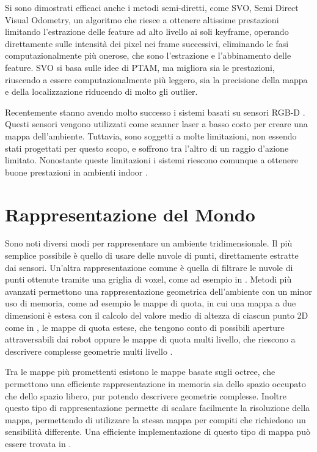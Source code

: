 Si sono dimostrati efficaci anche i metodi semi-diretti, come SVO, Semi Direct Visual Odometry, un algoritmo che riesce a ottenere altissime prestazioni limitando l'estrazione delle feature ad alto livello ai soli keyframe, operando direttamente sulle intensità dei pixel nei frame successivi, eliminando le fasi computazionalmente più onerose, che sono l'estrazione e l'abbinamento delle feature. SVO si basa sulle idee di PTAM, ma migliora sia le prestazioni, riuscendo a essere computazionalmente più leggero, sia la precisione della mappa e della localizzazione riducendo di molto gli outlier.

Recentemente stanno avendo molto successo i sistemi basati su sensori RGB-D \cite{izadi2011kinectfusion} \cite{henry2012rgb}. Questi sensori vengono utilizzati come scanner laser a basso costo per creare una mappa dell'ambiente. Tuttavia, sono soggetti a molte limitazioni, non essendo stati progettati per questo scopo, e soffrono tra l'altro di un raggio d'azione limitato. Nonostante queste limitazioni i sistemi riescono comunque a ottenere buone prestazioni in ambienti indoor \cite{sturm2012benchmark}.

\section{Rappresentazione del Mondo}

Sono noti diversi modi per rappresentare un ambiente tridimensionale.
Il più semplice possibile è quello di usare delle nuvole di punti, direttamente estratte dai sensori. Un'altra rappresentazione comune è quella di filtrare le nuvole di punti ottenute tramite una griglia di voxel, come ad esempio in \cite{30724}.
Metodi più avanzati permettono una rappresentazione geometrica dell'ambiente con un minor uso di memoria, come ad esempio le mappe di quota, in cui una mappa a due dimensioni è estesa con il calcolo del valore medio di altezza di ciascun punto 2D come in \cite{herbert1989terrain}, le mappe di quota estese, che tengono conto di possibili aperture attraversabili dai robot oppure le mappe di quota multi livello, che riescono a descrivere complesse geometrie multi livello \cite{4058725}.

Tra le mappe più promettenti esistono le mappe basate sugli octree, che permettono una efficiente rappresentazione in memoria sia dello spazio occupato che dello spazio libero, pur potendo descrivere geometrie complesse. Inoltre questo tipo di rappresentazione permette di scalare facilmente la risoluzione della mappa, permettendo di utilizzare la stessa mappa per compiti che richiedono un sensibilità differente. Una efficiente implementazione di questo tipo di mappa può essere trovata in \cite{hornung13auro}.

